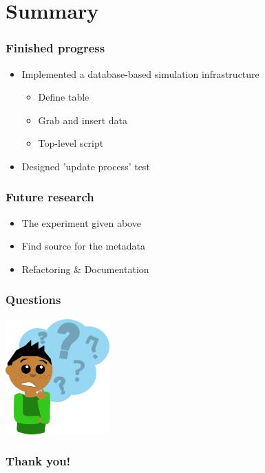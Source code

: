 \documentclass[12pt]{beamer}
\begin{document}
\section{Summary}
\begin{frame}
\frametitle{Finished progress}
\begin{itemize}
\item Implemented a database-based simulation infrastructure 
\begin{itemize}
\item Define table
\item Grab and insert data
\item Top-level script
\end{itemize}
\item Designed 'update process' test
\end{itemize}
\end{frame}

\begin{frame}
\frametitle{Future research}
\begin{itemize}
\item The experiment given above
\item Find source for the metadata
\item Refactoring \& Documentation
\end{itemize}
\end{frame}


\begin{frame}
\frametitle{Questions}
\begin{center}
\includegraphics[width = 0.3\textwidth]{question.png}
\end{center}
\end{frame}
 
 
\begin{frame}
\frametitle{Thank you!}
\end{frame}
\end{document}
